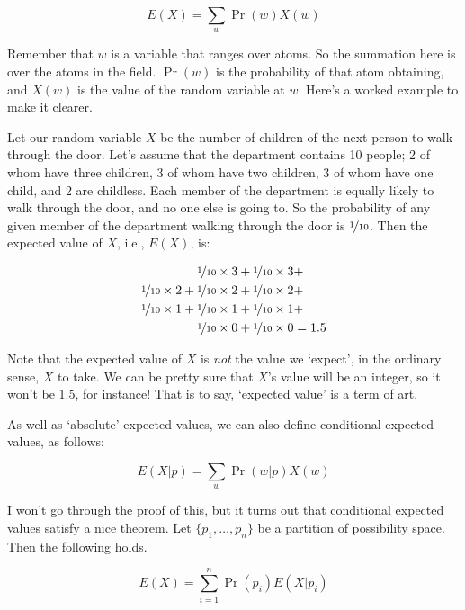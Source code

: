 \documentclass[
  11pt,
  letterpaper,
]{scrbook}
\begin{document}
\begin{equation*}
E(X) = \sum_w \Pr(w)X(w)
\end{equation*}

Remember that \(w\) is a variable that ranges over atoms. So the
summation here is over the atoms in the field. \(\Pr(w)\) is the
probability of that atom obtaining, and \(X(w)\) is the value of the
random variable at \(w\). Here's a worked example to make it clearer.

Let our random variable \(X\) be the number of children of the next
person to walk through the door. Let's assume that the department
contains 10 people; 2 of whom have three children, 3 of whom have two
children, 3 of whom have one child, and 2 are childless. Each member of
the department is equally likely to walk through the door, and no one
else is going to. So the probability of any given member of the
department walking through the door is \(\nicefrac{1}{10}\). Then the
expected value of \(X\), i.e., \(E(X)\), is:

\begin{align*}
\nicefrac{1}{10} \times 3 + \nicefrac{1}{10} \times 3 &+ \\
\nicefrac{1}{10} \times 2 + \nicefrac{1}{10} \times 2 + \nicefrac{1}{10} \times 2 &+ \\
\nicefrac{1}{10} \times 1 + \nicefrac{1}{10} \times 1 + \nicefrac{1}{10} \times 1 &+ \\
\nicefrac{1}{10} \times 0 + \nicefrac{1}{10} \times 0 &= 1.5 \\
\end{align*}

Note that the expected value of \(X\) is \emph{not} the value we
`expect', in the ordinary sense, \(X\) to take. We can be pretty sure
that \(X\)'s value will be an integer, so it won't be 1.5, for instance!
That is to say, `expected value' is a term of art.

As well as `absolute' expected values, we can also define conditional
expected values, as follows:

\begin{equation*}
E(X | p) = \sum_w \Pr(w | p)X(w)
\end{equation*}

I won't go through the proof of this, but it turns out that conditional
expected values satisfy a nice theorem. Let \(\{p_1, \dots, p_n\}\) be a
partition of possibility space. Then the following holds.

\begin{equation*}
E(X) = \sum_{i=1}^n \Pr(p_i) E(X | p_i)
\end{equation*}
\end{document}
